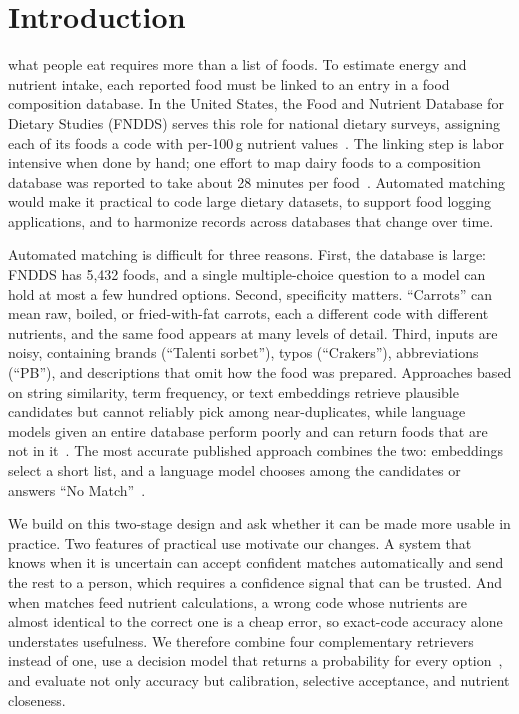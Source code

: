 \documentclass[11pt,journal,onecolumn]{IEEEtran}
\begin{document}
\section{Introduction}
 what people eat requires more than a list of foods. To estimate energy and nutrient intake, each reported food must be linked to an entry in a food composition database. In the United States, the Food and Nutrient Database for Dietary Studies (FNDDS) serves this role for national dietary surveys, assigning each of its foods a code with per-100\,g nutrient values~\cite{fndds}. The linking step is labor intensive when done by hand; one effort to map dairy foods to a composition database was reported to take about 28 minutes per food~\cite{lemay}. Automated matching would make it practical to code large dietary datasets, to support food logging applications, and to harmonize records across databases that change over time.

Automated matching is difficult for three reasons. First, the database is large: FNDDS has 5,432 foods, and a single multiple-choice question to a model can hold at most a few hundred options. Second, specificity matters. ``Carrots'' can mean raw, boiled, or fried-with-fat carrots, each a different code with different nutrients, and the same food appears at many levels of detail. Third, inputs are noisy, containing brands (``Talenti sorbet''), typos (``Crakers''), abbreviations (``PB''), and descriptions that omit how the food was prepared. Approaches based on string similarity, term frequency, or text embeddings retrieve plausible candidates but cannot reliably pick among near-duplicates, while language models given an entire database perform poorly and can return foods that are not in it~\cite{lemay}. The most accurate published approach combines the two: embeddings select a short list, and a language model chooses among the candidates or answers ``No Match''~\cite{lemay}.

We build on this two-stage design and ask whether it can be made more usable in practice. Two features of practical use motivate our changes. A system that knows when it is uncertain can accept confident matches automatically and send the rest to a person, which requires a confidence signal that can be trusted. And when matches feed nutrient calculations, a wrong code whose nutrients are almost identical to the correct one is a cheap error, so exact-code accuracy alone understates usefulness. We therefore combine four complementary retrievers instead of one, use a decision model that returns a probability for every option~\cite{jev}, and evaluate not only accuracy but calibration, selective acceptance, and nutrient closeness.
\end{document}
